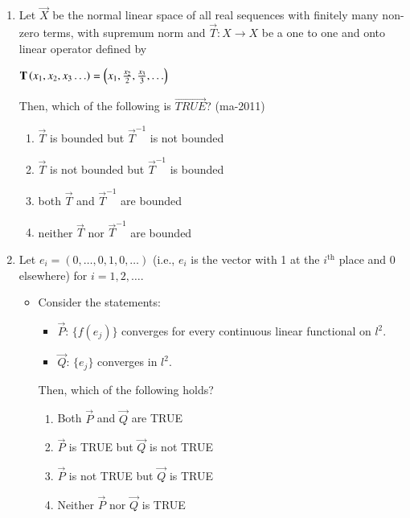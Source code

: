 \documentclass[journal,12pt,onecolumn]{IEEEtran}
\theoremstyle{remark}
\begin{document}
\begin{enumerate}
\begin{multicols}{4}
\begin{enumerate}
    \end{enumerate}
    \end{multicols}
    \item Let $\vec{X}$ be the normal linear space of all real sequences with finitely many non-zero terms, with supremum norm and $\vec{T} : X \rightarrow X$ be a one to one and onto linear operator defined by \\
    \begin{center}
    $\mathbf{T} \left(x_1,x_2,x_3\ldots\right) = \left(x_1,\frac{x_2}{2}, \frac{x_3}{3},\ldots\right)$
    \end{center}
    Then, which of the following is $\vec{TRUE}$? 
    \hfill{(ma-2011)}
    \begin{multicols}{2}
    \begin{enumerate}
    \item $\vec{T}$ is bounded but $\vec{T}^{-1}$ is not bounded
    \item $\vec{T}$ is not bounded but $\vec{T}^{-1}$ is bounded
    \item both $\vec{T}$ and $\vec{T}^{-1}$ are bounded
    \item neither  $\vec{T}$ nor $\vec{T}^{-1}$ are bounded
    \end{enumerate}
    \end{multicols}
    \item Let $e_i = (0, \ldots, 0, 1, 0, \ldots)$ (i.e., $e_i$ is the vector with 1 at the $i^{\text{th}}$ place and 0 elsewhere) for $i = 1, 2, \ldots$.
    \begin{itemize}
    	\item[] Consider the statements:
    	\begin{itemize}
    		\item $\vec{P}$: $\{f(e_j)\}$ converges for every continuous linear functional on $l^2$.
    		\item $\vec{Q}$: $\{e_j\}$ converges in $l^2$.
    	\end{itemize}
    	Then, which of the following holds?
    	\begin{enumerate}
    		\item Both $\vec{P}$ and $\vec{Q}$ are TRUE
    		\item $\vec{P}$ is TRUE but $\vec{Q}$ is not TRUE
    		\item $\vec{P}$ is not TRUE but $\vec{Q}$ is TRUE
    		\item Neither $\vec{P}$ nor $\vec{Q}$ is TRUE
    	\end{enumerate}
    \end{itemize}
    

\end{enumerate}
\end{document}
